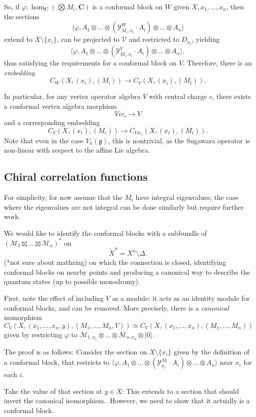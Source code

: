 \documentclass{article}
\newcommand{\CC}{\mathbold{C}}
\newcommand{\vac}{|0\rangle}
\newcommand{\Mm}{\mathcal{M}}
\newcommand{\Vv}{\mathcal{V}}
\newcommand{\Yy}{\mathcal{Y}}
\newcommand{\gf}{\mathfrak{g}}
\newcommand{\tk}{\textcolor{red}{*}}
\begin{document}
So, if $\varphi: \hom_\CC(\bigotimes M_i,\CC)$ is a conformal block on $W$ given $X,x_1,...,x_n$, then the sections
\[\langle \varphi,A_1 \otimes ... \otimes(\Yy^W_{M_i,x_i}\cdot A_i) \otimes ... \otimes A_n \rangle \]
extend to $X \setminus \{x_i\}$, can be projected to $\Vv$ and restricted to $D_{x_i}$, yielding
\[\langle \varphi,A_1 \otimes ... \otimes(\Yy^V_{M_i,x_i}\cdot A_i) \otimes ... \otimes A_n \rangle, \]
thus satisfying the requirements for a conformal block on $V$.  Therefore, there is an \textit{embedding}
\[C_W(X,(x_i),(M_i)) \rightarrow C_V(X,(x_i),(M_i)). \]

In particular, for any vertex operator algebra $V$ with central charge $c$, there exists a conformal vertex algebra morphism
\[Vir_c \rightarrow V \]
and a corresponding embedding
\[C_V(X,(x_i),(M_i)) \rightarrow C_{Vir_c}(X,(x_i),(M_i)). \]
Note that even in the case $V_k(\gf)$, this is nontrivial, as the Sugawara operator is non-linear with respect to the affine Lie algebra.
\subsection{Chiral correlation functions}
For simplicity, for now assume that the $M_i$ have integral eigenvalues; the case where the eigenvalues are not integral can be done similarly but require further work.

We would like to identify the conformal blocks with a subbundle of $(\Mm_1 \boxtimes ... \boxtimes \Mm_n)^*$ on
\[\mathring{X}^n=X^n \setminus \Delta. \]
(\tk not sure about mathring) on which the connection is closed, identifying conformal blocks on nearby points and producing a canonical way to describe the quantum states (up to possible monodromy).

First, note the effect of including $V$ as a module: it acts as an identity module for conformal blocks, and can be removed.  More precisely, there is a \textit{canonical} isomorphism
\[C_V(X,(x_1,...,x_n,y),(M_1,...,M_n,V)) \simeq C_V(X,(x_1,...,x_n),(M_1,...,M_n)) \]
given by restricting $\varphi$ to $\Mm_{1,x_1} \otimes ... \otimes \Mm_{n,x_n} \otimes \vac$.

The proof is as follows: Consider the section on $X \setminus \{x_i\}$ given by the definition of a conformal block, that restricts to $\langle \varphi,A_1 \otimes ... \otimes (\Yy^{M_i}_{x_i}\cdot A_i) \otimes ... \otimes A_n \rangle$ near $x_i$ for each $i$.

Take the value of that section at $y \in X$: This extends to a section that should invert the canonical isomorphism..  However, we need to show that it actually is a conformal block.
\end{document}
